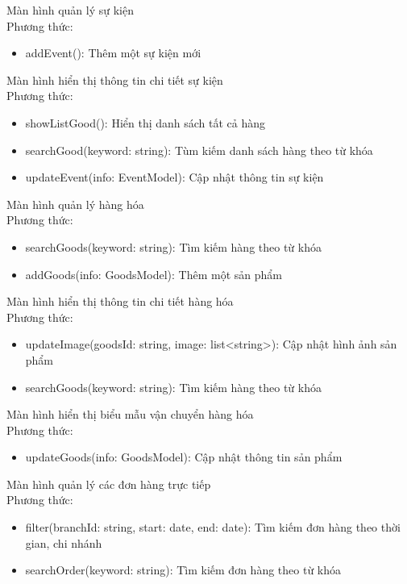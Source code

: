 Màn hình quản lý sự kiện\\
Phương thức:
\begin{itemize}
    \item addEvent(): Thêm một sự kiện mới
\end{itemize}
 
Màn hình hiển thị thông tin chi tiết sự kiện\\
Phương thức:
\begin{itemize}
    \item showListGood(): Hiển thị danh sách tất cả hàng
    \item searchGood(keyword: string): Tùm kiếm danh sách hàng theo từ khóa
    \item updateEvent(info: EventModel): Cập nhật thông tin sự kiện
\end{itemize}
 
Màn hình quản lý hàng hóa\\
Phương thức:
\begin{itemize}
    \item searchGoods(keyword: string): Tìm kiếm hàng theo từ khóa
    \item addGoods(info: GoodsModel): Thêm một sản phẩm
\end{itemize}
 
Màn hình hiển thị thông tin chi tiết hàng hóa\\
Phương thức:
\begin{itemize}
    \item updateImage(goodsId: string, image: list<string>): Cập nhật hình ảnh sản phẩm
    \item searchGoods(keyword: string): Tìm kiếm hàng theo từ khóa
\end{itemize}
 
Màn hình hiển thị biểu mẫu vận chuyển hàng hóa\\
Phương thức:
\begin{itemize}
    \item updateGoods(info: GoodsModel): Cập nhật thông tin sản phẩm
\end{itemize}
 
Màn hình quản lý các đơn hàng trực tiếp\\
Phương thức:
\begin{itemize}
    \item filter(branchId: string, start: date, end: date): Tìm kiếm đơn hàng theo thời gian, chi nhánh
    \item searchOrder(keyword: string): Tìm kiếm đơn hàng theo từ khóa
\end{itemize}
 
